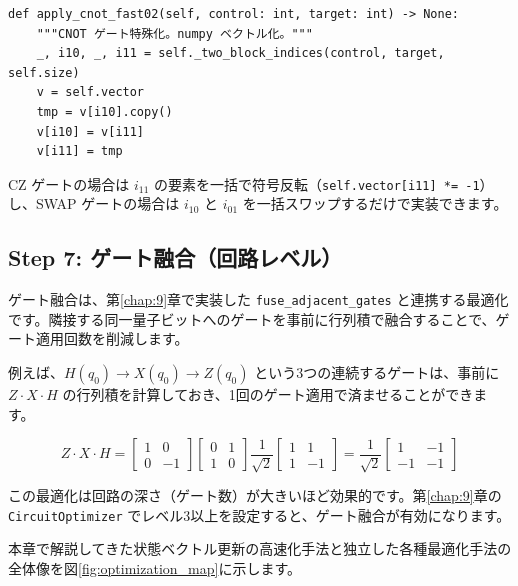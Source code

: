 \begin{lstlisting}[caption=CNOT 特殊化のベクトル化版（qubit.py）, label=src:twoq_vectorized]
def apply_cnot_fast02(self, control: int, target: int) -> None:
    """CNOT ゲート特殊化。numpy ベクトル化。"""
    _, i10, _, i11 = self._two_block_indices(control, target, self.size)
    v = self.vector
    tmp = v[i10].copy()
    v[i10] = v[i11]
    v[i11] = tmp
\end{lstlisting}

CZ ゲートの場合は $i_{11}$ の要素を一括で符号反転（\texttt{self.vector[i11] *= -1}）し、SWAP ゲートの場合は $i_{10}$ と $i_{01}$ を一括スワップするだけで実装できます。

\subsection{Step 7: ゲート融合（回路レベル）}

ゲート融合は、第\ref{chap:9}章で実装した \texttt{fuse\_adjacent\_gates} と連携する最適化です。隣接する同一量子ビットへのゲートを事前に行列積で融合することで、ゲート適用回数を削減します。

例えば、$H(q_0) \to X(q_0) \to Z(q_0)$ という3つの連続するゲートは、事前に $Z \cdot X \cdot H$ の行列積を計算しておき、1回のゲート適用で済ませることができます。

\begin{equation}
Z \cdot X \cdot H = \begin{bmatrix}1&0\\0&-1\end{bmatrix}
\begin{bmatrix}0&1\\1&0\end{bmatrix}
\frac{1}{\sqrt{2}}\begin{bmatrix}1&1\\1&-1\end{bmatrix}
= \frac{1}{\sqrt{2}}\begin{bmatrix}1&-1\\-1&-1\end{bmatrix}
\end{equation}

この最適化は回路の深さ（ゲート数）が大きいほど効果的です。第\ref{chap:9}章の \texttt{CircuitOptimizer} でレベル3以上を設定すると、ゲート融合が有効になります。

本章で解説してきた状態ベクトル更新の高速化手法と独立した各種最適化手法の全体像を図\ref{fig:optimization_map}に示します。

